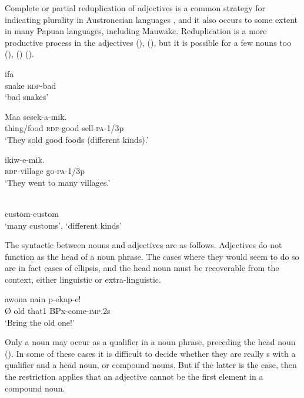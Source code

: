 Complete or partial reduplication of adjectives is a common strategy for indicating plurality in Austronesian languages \citep[62]{Wurm1982}, and it also occurs to some extent in many Papuan languages, including Mauwake. Reduplication is a more productive process in the adjectives (), (), but it is possible for a few nouns too (), () (). 

\ea%
\label{ex:x12}
\gll ifa  \\
snake \textsc{rdp}-bad\\
\glt`bad snakes'
\z

\ea%
\label{ex:x481}
\gll Maa  sesek-a-mik. \\
thing/food \textsc{rdp}-good sell-\textsc{pa}-1/3p\\
\glt`They sold good foods (different kinds).'
\z

\ea%
\label{ex:x13}
\gll {} ikiw-e-mik. \\
\textsc{rdp}-village go-\textsc{pa}-1/3p\\
\glt`They went to many villages.'
\z

\ea%
\label{ex:x1859}
\gll {} \\
custom-custom\\
\glt`many customs', `different kinds'
\z

The syntactic  between nouns and adjectives are as follows. Adjectives do not function as the head of a noun phrase. The cases where they would seem to do so are in fact cases of ellipsis, and the head noun must be recoverable from the context, either linguistic or extra-linguistic. 

\ea%
\label{ex:x14}
\gll {\O} awona nain p-ekap-e! \\
{\O} old that1 BPx-come-\textsc{imp}.2s\\
\glt`Bring the old one!'
\z

Only a noun may occur as a qualifier in a noun phrase, preceding the head noun (). In some of these cases it is difficult to decide whether they are really s with a qualifier and a head noun, or compound nouns. But if the latter is the case, then the restriction applies that an adjective cannot be the first element in a compound noun.

